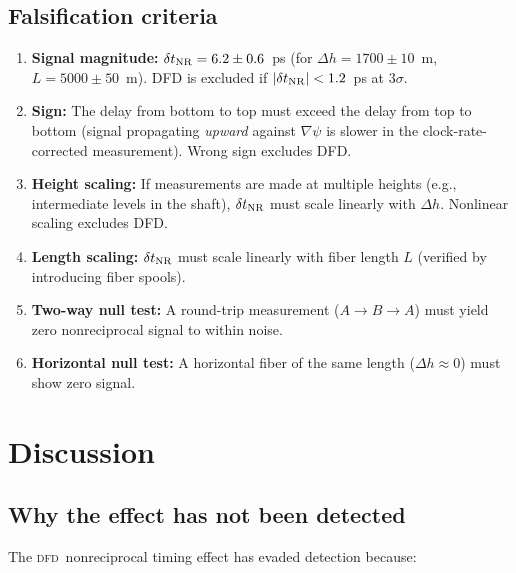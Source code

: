 \documentclass[aps,prl,twocolumn,superscriptaddress,showpacs]{revtex4-2}
\newcommand{\DFD}{\textsc{dfd}}
\begin{document}
\subsection{Falsification criteria}

\begin{enumerate}
\item \textbf{Signal magnitude:} $\delta t_{\rm NR} = 6.2 \pm 0.6$~ps
      (for $\Delta h = 1700 \pm 10$~m, $L = 5000 \pm 50$~m).
      DFD is excluded if $|\delta t_{\rm NR}| < 1.2$~ps at $3\sigma$.

\item \textbf{Sign:} The delay from bottom to top must exceed
      the delay from top to bottom (signal propagating \emph{upward}
      against $\nabla\psi$ is slower in the clock-rate-corrected
      measurement).  Wrong sign excludes DFD.

\item \textbf{Height scaling:} If measurements are made at
      multiple heights (e.g., intermediate levels in the shaft),
      $\delta t_{\rm NR}$ must scale linearly with $\Delta h$.
      Nonlinear scaling excludes DFD.

\item \textbf{Length scaling:} $\delta t_{\rm NR}$ must scale
      linearly with fiber length $L$ (verified by introducing
      fiber spools).

\item \textbf{Two-way null test:} A round-trip measurement
      ($A\to B\to A$) must yield zero nonreciprocal signal to
      within noise.

\item \textbf{Horizontal null test:} A horizontal fiber of the
      same length ($\Delta h \approx 0$) must show zero signal.
\end{enumerate}

\section{Discussion}\label{sec:discussion}

\subsection{Why the effect has not been detected}

The \DFD\ nonreciprocal timing effect has evaded detection because:
\end{document}
